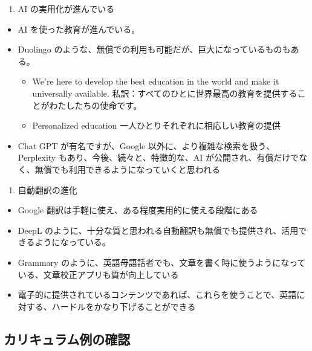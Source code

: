 \documentclass[
]{bxjsbook}
\providecommand{\tightlist}{%
  \setlength{\itemsep}{0pt}\setlength{\parskip}{0pt}}
\theoremstyle{definition}
\theoremstyle{definition}
\theoremstyle{definition}
\theoremstyle{definition}
\theoremstyle{remark}
\begin{document}
\begin{enumerate}
\def\labelenumi{\arabic{enumi}.}
\setcounter{enumi}{3}
\tightlist
\item
  AI の実用化が進んでいる
\end{enumerate}

\begin{itemize}
\tightlist
\item
  AI を使った教育が進んでいる。
\item
  Duolingo のような、無償での利用も可能だが、巨大になっているものもある。

  \begin{itemize}
  \tightlist
  \item
    We're here to develop the best education in the world and make it universally available. 私訳：すべてのひとに世界最高の教育を提供することがわたしたちの使命です。
  \item
    Personalized education 一人ひとりそれぞれに相応しい教育の提供
  \end{itemize}
\item
  Chat GPT が有名ですが、Google 以外に、より複雑な検索を扱う、Perplexity もあり、今後、続々と、特徴的な、AI が公開され、有償だけでなく、無償でも利用できるようになっていくと思われる
\end{itemize}

\begin{enumerate}
\def\labelenumi{\arabic{enumi}.}
\setcounter{enumi}{4}
\tightlist
\item
  自動翻訳の進化
\end{enumerate}

\begin{itemize}
\tightlist
\item
  Google 翻訳は手軽に使え、ある程度実用的に使える段階にある
\item
  DeepL のように、十分な質と思われる自動翻訳も無償でも提供され、活用できるようになっている。
\item
  Grammary のように、英語母語話者でも、文章を書く時に使うようになっている、文章校正アプリも質が向上している
\item
  電子的に提供されているコンテンツであれば、これらを使うことで、英語に対する、ハードルをかなり下げることができる
\end{itemize}

\hypertarget{ux30abux30eaux30adux30e5ux30e9ux30e0ux4f8bux306eux78baux8a8d}{%
\subsection{カリキュラム例の確認}\label{ux30abux30eaux30adux30e5ux30e9ux30e0ux4f8bux306eux78baux8a8d}}
\end{document}
